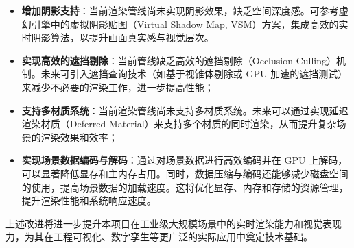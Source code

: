 \begin{itemize}
    \item \textbf{增加阴影支持}：当前渲染管线尚未实现阴影效果，缺乏空间深度感。可参考虚幻引擎中的虚拟阴影贴图（Virtual Shadow Map, VSM）方案\cite{VSM}，集成高效的实时阴影算法，以提升画面真实感与视觉层次。

    \item \textbf{实现高效的遮挡剔除}：当前管线缺乏高效的遮挡剔除（Occlusion Culling）机制。未来可引入遮挡查询技术（如基于视锥体剔除或 GPU 加速的遮挡测试）来减少不必要的渲染工作，进一步提高性能\cite{coorg1997}；

    \item \textbf{支持多材质系统}：当前渲染管线尚未支持多材质系统。未来可以通过实现延迟渲染材质（Deferred Material）来支持多个材质的同时渲染\cite{burns2013}，从而提升复杂场景的渲染效果和效率；

    \item \textbf{实现场景数据编码与解码}：通过对场景数据进行高效编码并在 GPU 上解码，可以显著降低显存和主内存占用。同时，数据压缩与编码还能够减少磁盘空间的使用，提高场景数据的加载速度。这将优化显存、内存和存储的资源管理，提升渲染性能和系统响应速度\cite{Mlakar2024}。
\end{itemize}

上述改进将进一步提升本项目在工业级大规模场景中的实时渲染能力和视觉表现力，为其在工程可视化、数字孪生等更广泛的实际应用中奠定技术基础。
